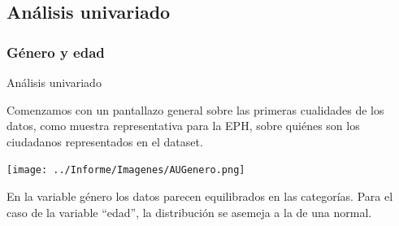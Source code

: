 \documentclass[pdf]{beamer}
\begin{document}
{%

\subsection{Análisis univariado}

    \subsubsection{Género y edad}

\begin{frame}{Análisis univariado}

    Comenzamos con un pantallazo general sobre las primeras cualidades de los datos, como muestra representativa para la EPH, sobre quiénes son los ciudadanos representados en el dataset.

    \begin{center}
        \texttt{[image: ../Informe/Imagenes/AUGenero.png]}
    \end{center}

    En la variable género los datos parecen equilibrados en las categorías. Para el caso de la variable ``edad'', la distribución se asemeja a la de una normal.

\end{frame}
              


    
           

}
\end{document}
